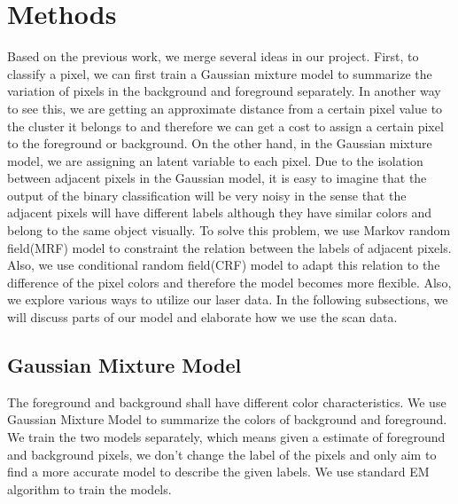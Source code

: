 \documentclass{article} %
\begin{document}
\section{Methods}
Based on the previous work, we merge several ideas in our
project. First, to classify a pixel, we can first train a Gaussian
mixture model to summarize the variation of pixels in the background
and foreground separately. In another way to see this, we are getting
an approximate distance from a certain pixel value to the cluster it
belongs to and therefore we can get a cost to assign a certain pixel
to the foreground or background. On the other hand, in the Gaussian
mixture model, we are assigning an latent variable to each pixel. Due
to the isolation between adjacent pixels in the Gaussian model, it is
easy to imagine that the output of the binary classification will be
very noisy in the sense that the adjacent pixels will have different
labels although they have similar colors and belong to the same object
visually. To solve this problem, we use Markov random field(MRF) model to
constraint the relation between the labels of adjacent pixels. Also,
we use conditional random field(CRF) model to adapt this relation to
the difference of the pixel colors and therefore the model becomes
more flexible. Also, we explore various ways to utilize our laser
data. In the following subsections, we will discuss parts of our model
and elaborate how we use the scan data.
\subsection{Gaussian Mixture Model}
The foreground and background shall have different color
characteristics. We use Gaussian Mixture Model to summarize the colors
of background and foreground. We train the two models separately,
which means given a estimate of foreground and background pixels, we
don't change the label of the pixels and only aim to find a more
accurate model to describe the given labels. We use standard EM
algorithm to train the models.
\end{document}
